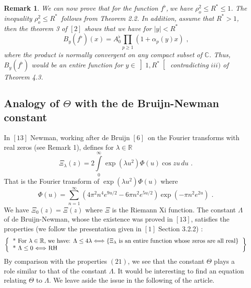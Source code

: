 \documentclass{article}
\newtheorem{remark}{Remark}
\begin{document}
\begin{remark}
\bigskip We can now prove that for the function $f^{\flat }$,$\ $we have $\rho _{o}^{2}\leq R^{\ast }\leq 1$. The inequality $\rho _{o}^{2}\leq
R^{\ast }$\ follows from Theorem 2.2. In addition, assume that $R^{\ast }>1$, then the theorem 3 of $\left[ 2\right] $ shows that we have for $\left|
y\right| <R^{\ast }$\begin{equation*}
B_{y}\left( f^{\flat }\right) \left( x\right) =A_{0}^{\flat
}\prod\limits_{p\geq 1}\left( 1+\alpha _{p}\left( y\right) x\right) \text{ ,}
\end{equation*}
where the product is normally convergent on any compact subset of $\mathbb{C}
$. Thus, $B_{y}\left( f^{\flat }\right) $ would be an entire function for $y\in \left] 1,R^{\ast }\right[ $ contradicting $iii)$ of Theorem 4.3.
\end{remark}

\subsection{\protect\bigskip Analogy of $\Theta $ with the de Bruijn-Newman
constant}

In $\left[ 13\right] $ Newman, working after de Bruijn $\left[ 6\right] $\
on the Fourier transforms with real zeros (see Remark 1), defines for $\lambda \in \mathbb{R}$ 
\begin{equation*}
\Xi _{\lambda }\left( z\right) =2\int\limits_{0}^{\infty }\exp \left(
\lambda u^{2}\right) \Phi \left( u\right) \cos zu\,du\text{ .}
\end{equation*}
That is the Fourier transform of $\exp \left( \lambda u^{2}\right) \Phi
\left( u\right) $ where 
\begin{equation*}
\Phi \left( u\right) =\sum\limits_{n=1}^{\infty }\left( 4\pi
^{2}n^{4}e^{9u/2}-6\pi n^{2}e^{5u/2}\right) \exp \left( -\pi
n^{2}e^{2u}\right) \text{ .}
\end{equation*}
We have $\Xi _{0}\left( z\right) =\Xi \left( z\right) $ where $\Xi $ is the
Riemann Xi function. The constant $\Lambda $ of de Bruijn-Newman, whose the
existence was proved in $\left[ 13\right] $, satisfies the properties (we
follow the presentation given in $\left[ 1\right] $ Section 3.2.2) : 
\begin{equation*}
\left\{ 
\begin{tabular}{l}
{*} For $\lambda \in \mathbb{R}$, we have: $\Lambda \leq 4\lambda
\Longleftrightarrow \left\{ \Xi _{\lambda }\text{ is an entire function
whose zeros are all real}\right\} $ \\ 
{*} $\Lambda \leq 0$ $\Longleftrightarrow $ RH
\end{tabular}
\right\}
\end{equation*}
By comparison with the properties $\left( 21\right) $, we see that the
constant $\Theta $ plays a role similar to that of the constant $\Lambda $.
It would be interesting to find an equation relating $\Theta $ to $\Lambda $. We leave aside the issue in the following of the article.
\end{document}
